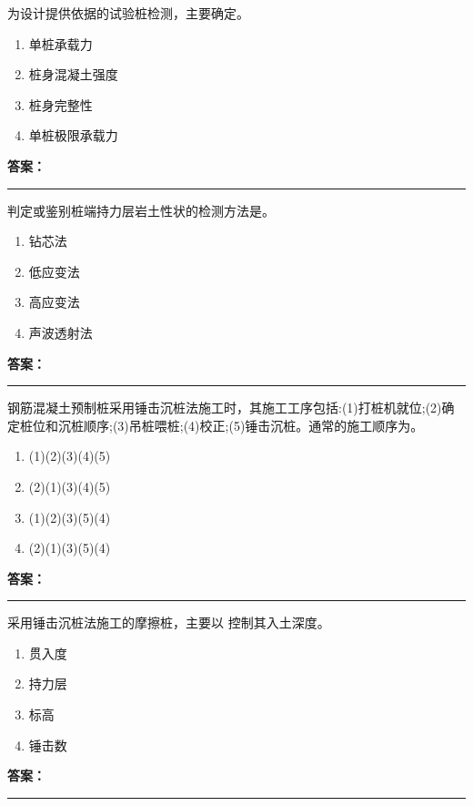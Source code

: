 \documentclass[UTF8,fontset=fandol,11pt]{ctexart}
\newcommand{\answerline}{\textcolor{answerred}{\rule{2.4cm}{0.7pt}}}
\begin{document}
\vspace{0.2em}

\begin{quizbox}[title={第 5 题}]
为设计提供依据的试验桩检测，主要确定。\\
\begin{enumerate}[label=\Alph*.]
\item 单桩承载力
\item 桩身混凝土强度
\item 桩身完整性
\item 单桩极限承载力
\end{enumerate}
\textbf{\textcolor{answerred}{答案：}} \answerline
\end{quizbox}

\vspace{0.2em}

\begin{quizbox}[title={第 6 题}]
判定或鉴别桩端持力层岩土性状的检测方法是。\\
\begin{enumerate}[label=\Alph*.]
\item 钻芯法
\item 低应变法
\item 高应变法
\item 声波透射法
\end{enumerate}
\textbf{\textcolor{answerred}{答案：}} \answerline
\end{quizbox}

\vspace{0.2em}

\begin{quizbox}[title={第 7 题}]
钢筋混凝土预制桩采用锤击沉桩法施工时，其施工工序包括:(1)打桩机就位;(2)确定桩位和沉桩顺序;(3)吊桩喂桩;(4)校正;(5)锤击沉桩。通常的施工顺序为。\\
\begin{enumerate}[label=\Alph*.]
\item (1)(2)(3)(4)(5)
\item (2)(1)(3)(4)(5)
\item (1)(2)(3)(5)(4)
\item (2)(1)(3)(5)(4)
\end{enumerate}
\textbf{\textcolor{answerred}{答案：}} \answerline
\end{quizbox}

\vspace{0.2em}

\begin{quizbox}[title={第 8 题}]
采用锤击沉桩法施工的摩擦桩，主要以 控制其入土深度。\\
\begin{enumerate}[label=\Alph*.]
\item 贯入度
\item 持力层
\item 标高
\item 锤击数
\end{enumerate}
\textbf{\textcolor{answerred}{答案：}} \answerline
\end{quizbox}
\end{document}
